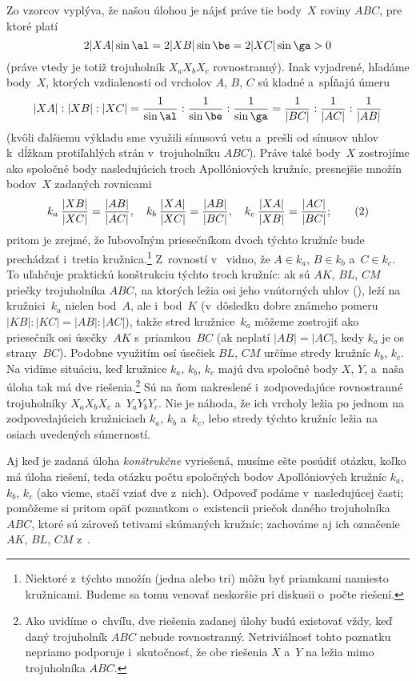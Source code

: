 {Zo vzorcov  vyplýva, že našou úlohou je nájsť
práve tie body~$X$ roviny $ABC$, pre ktoré platí
$$
2|XA|\sin\al=2|XB|\sin\be=2|XC|\sin\ga>0
$$
(práve vtedy je totiž trojuholník $X_aX_bX_c$ rovnostranný). Inak
vyjadrené, hľadáme body~$X$, ktorých vzdialenosti od vrcholov $A$,
$B$, $C$ sú kladné a~spĺňajú úmeru
$$
|XA|:|XB|:|XC|=\frac{1}{\sin\al}:\frac{1}{\sin\be}:\frac{1}{\sin\ga}
=\frac{1}{|BC|}:\frac{1}{|AC|}:\frac{1}{|AB|}
$$
(kvôli ďalšiemu výkladu sme využili sínusovú vetu a~prešli od sínusov
uhlov k~dĺžkam protiľahlých strán v~trojuholníku $ABC$).
Práve také body~$X$ zostrojíme ako spoločné body nasledujúcich
troch Apollóniových kružníc, presnejšie množín bodov~$X$ zadaných rovnicami
$$
k_a\: \frac{|XB|}{|XC|}=\frac{|AB|}{|AC|},\quad
k_b\: \frac{|XA|}{|XC|}=\frac{|AB|}{|BC|},\quad
k_c\: \frac{|XA|}{|XB|}=\frac{|AC|}{|BC|};
\tag2$$
pritom je zrejmé, že ľubovoľným priesečníkom dvoch týchto kružníc
bude prechádzať i~tretia kružnica.\footnote{Niektoré z~týchto množín
(jedna alebo tri) môžu byť priamkami namiesto kružnicami.
Budeme sa tomu venovať neskoršie pri diskusii o~počte riešení.}
Z~rovností v~ vidno, že $A\in k_a$,
$B\in k_b$ a~$C\in k_c$. To uľahčuje praktickú konštrukciu
týchto troch kružníc: ak sú $AK$, $BL$, $CM$ priečky trojuholníka $ABC$,
na ktorých ležia osi jeho vnútorných uhlov (\obr),
leží na kružnici~$k_a$ nielen bod~$A$, ale i~bod~$K$
(v~dôsledku dobre známeho pomeru $|KB|:|KC|=|AB|:|AC|$), takže
stred kružnice~$k_a$ môžeme zostrojiť ako priesečník osi úsečky~$AK$
s~priamkou~$BC$ (ak neplatí $|AB|=|AC|$,
kedy $k_a$ je os strany~$BC$). Podobne využitím osí úsečiek $BL$, $CM$
určíme stredy kružníc $k_b$, $k_c$.
Na  vidíme situáciu, keď kružnice $k_a$, $k_b$,
$k_c$ majú dva spoločné body $X$, $Y$, a~naša úloha tak má dve
riešenia.\footnote{Ako uvidíme o~chvíľu, dve riešenia zadanej úlohy budú
existovať vždy, keď daný trojuholník $ABC$ nebude rovnostranný.
Netriviálnosť tohto poznatku nepriamo podporuje i~skutočnosť,
že obe riešenia $X$ a~$Y$ na  ležia mimo trojuholníka $ABC$.}
Sú na ňom nakreslené i~zodpovedajúce rovnostranné trojuholníky
$X_aX_bX_c$ a~$Y_aY_bY_c$. Nie je náhoda, že ich vrcholy ležia
po jednom na zodpovedajúcich kružniciach $k_a$, $k_b$ a~$k_c$,
lebo stredy týchto kružníc ležia na osiach uvedených súmerností.
%

Aj keď je zadaná úloha {\it konštrukčne\/} vyriešená, musíme
ešte posúdiť otázku, koľko má úloha riešení, teda
otázku počtu spoločných bodov Apollóniových kružníc
$k_a$, $k_b$, $k_c$ (ako vieme, stačí vziať dve z~nich).
Odpoveď podáme v~nasledujúcej časti; pomôžeme si pritom opäť
poznatkom o~existencii priečok daného trojuholníka $ABC$, ktoré sú zároveň
tetivami skúmaných kružníc; zachováme aj ich označenie $AK$,
$BL$, $CM$ z~.

}
